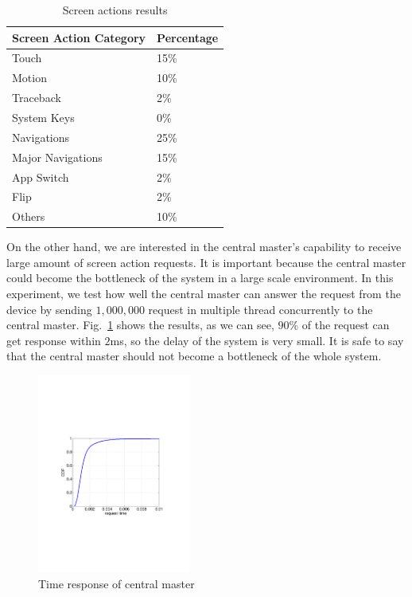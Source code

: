 \begin{table}
\centering
\caption{Screen actions results}
\begin{tabular}{ll} \toprule
Screen Action Category & Percentage \\\midrule
Touch & 15\% \\
Motion & 10\% \\
Traceback & 2\% \\
System Keys & 0\% \\
Navigations & 25\% \\
Major Navigations & 15\% \\
App Switch & 2\%\\
Flip & 2\% \\
Others & 10\% \\\bottomrule
\end{tabular}
\label{tab:screen}
\end{table}

On the other hand, we are interested in the central master's capability to receive large amount of screen action requests. It is important because the central master could become the bottleneck of the system in a large scale environment. In this experiment, we test how well the central master can answer the request from the device by sending $1,000,000$ request in multiple thread concurrently to the central master. Fig.~\ref{fig:time} shows the results, as we can see, $90\%$ of the request can get response within $2$ms, so the delay of the system is very small. It is safe to say that the central master should not become a bottleneck of the whole system.

\begin{figure}
\includegraphics[width=0.45\textwidth]{figures/time.pdf}
\caption{Time response of central master}
\label{fig:time}
\end{figure}
